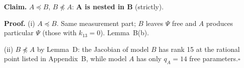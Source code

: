 \documentclass[10pt,a4paper]{article}
\newcommand{\nest}{\preceq}
\newcommand{\nnest}{\not\preceq}
\begin{document}
\par\bigskip
\noindent\textbf{Claim.} $A \nest B$, $B \nnest A$: \textbf{A is nested in B} (strictly).\par\smallskip
\noindent\textbf{Proof.} (i) $A\nest B$. Same measurement part; $B$ leaves $\Psi$ free and $A$ produces particular $\Psi$ (those with $k_{13}=0$). Lemma~B(b).\par\smallskip
\noindent(ii) $B\nnest A$ by Lemma~D: the Jacobian of model $B$ has rank 15 at the rational point listed in Appendix~B, while model $A$ has only $q_A=14$ free parameters.\hfill$\square$\par\medskip
{}

\clearpage
\end{document}

